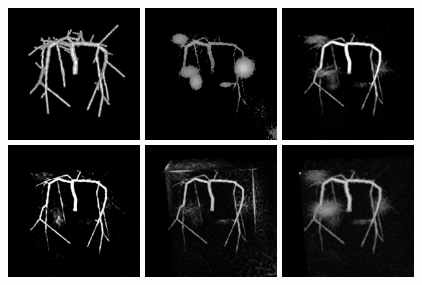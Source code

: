 \begin{figure}[!ht]
  \centering
  
  \includegraphics[clip = true, trim = 80 80 80 80, height=3.5cm]{Images/Vascu_4_GT.png}
  \includegraphics[clip = true, trim = 80 80 80 80, height=3.5cm]{Images/Vascu_4_Baseline.png}
  \includegraphics[clip = true, trim = 80 80 80 80, height=3.5cm]{Images/Vascu_4_Frangi.png}
  \\
  \includegraphics[clip = true, trim = 80 80 80 80, height=3.5cm]{Images/Vascu_4_Jerman.png}
  \includegraphics[clip = true, trim = 80 80 80 80, height=3.5cm]{Images/Vascu_4_OOF_GM.png}
  \includegraphics[clip = true, trim = 80 80 80 80, height=3.5cm]{Images/Vascu_4_Meijering.png}

\end{figure}
